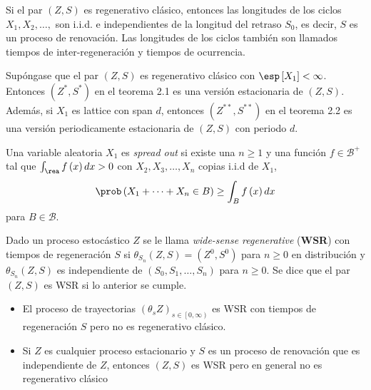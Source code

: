 \begin{Note}
Si el par $\left(Z,S\right)$ es regenerativo cl\'asico, entonces las longitudes de los ciclos $X_{1},X_{2},\ldots,$ son i.i.d. e independientes de la longitud del retraso $S_{0}$, es decir, $S$ es un proceso de renovaci\'on. Las longitudes de los ciclos tambi\'en son llamados tiempos de inter-regeneraci\'on y tiempos de ocurrencia.

\end{Note}

\begin{Teo}
Sup\'ongase que el par $\left(Z,S\right)$ es regenerativo cl\'asico con $\esp\left[X_{1}\right]<\infty$. Entonces $\left(Z^{*},S^{*}\right)$ en el teorema 2.1 es una versi\'on estacionaria de $\left(Z,S\right)$. Adem\'as, si $X_{1}$ es lattice con span $d$, entonces $\left(Z^{**},S^{**}\right)$ en el teorema 2.2 es una versi\'on periodicamente estacionaria de $\left(Z,S\right)$ con periodo $d$.

\end{Teo}

\begin{Def}
Una variable aleatoria $X_{1}$ es \textit{spread out} si existe una $n\geq1$ y una  funci\'on $f\in\mathcal{B}^{+}$ tal que $\int_{\rea}f\left(x\right)dx>0$ con $X_{2},X_{3},\ldots,X_{n}$ copias i.i.d  de $X_{1}$, $$\prob\left(X_{1}+\cdots+X_{n}\in B\right)\geq\int_{B}f\left(x\right)dx$$ para $B\in\mathcal{B}$.

\end{Def}



\begin{Def}
Dado un proceso estoc\'astico $Z$ se le llama \textit{wide-sense regenerative} (\textbf{WSR}) con tiempos de regeneraci\'on $S$ si $\theta_{S_{n}}\left(Z,S\right)=\left(Z^{0},S^{0}\right)$ para $n\geq0$ en distribuci\'on y $\theta_{S_{n}}\left(Z,S\right)$ es independiente de $\left(S_{0},S_{1},\ldots,S_{n}\right)$ para $n\geq0$.
Se dice que el par $\left(Z,S\right)$ es WSR si lo anterior se cumple.
\end{Def}


\begin{Note}
\begin{itemize}
\item El proceso de trayectorias $\left(\theta_{s}Z\right)_{s\in\left[0,\infty\right)}$ es WSR con tiempos de regeneraci\'on $S$ pero no es regenerativo cl\'asico.

\item Si $Z$ es cualquier proceso estacionario y $S$ es un proceso de renovaci\'on que es independiente de $Z$, entonces $\left(Z,S\right)$ es WSR pero en general no es regenerativo cl\'asico

\end{itemize}

\end{Note}


